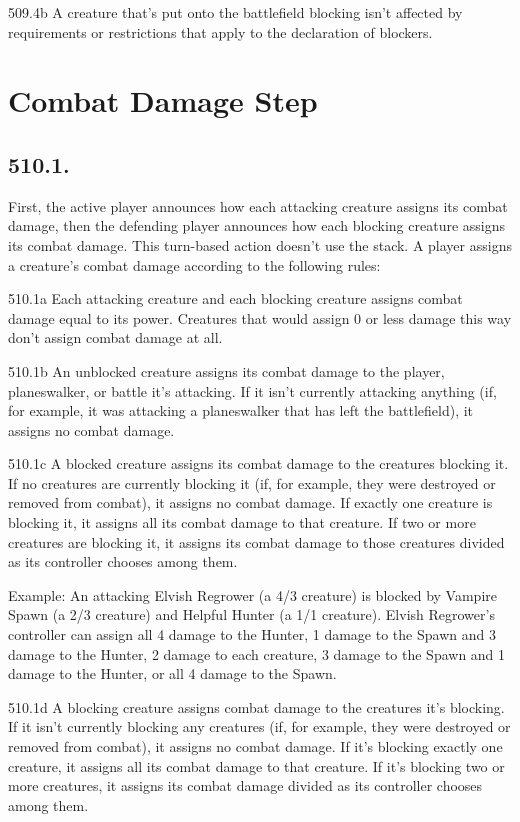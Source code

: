 509.4b A creature that’s put onto the battlefield blocking isn’t affected by requirements or restrictions that apply to the declaration of blockers.

\section{Combat Damage Step}
\subsection*{510.1.}
First, the active player announces how each attacking creature assigns its combat damage, then the defending player announces how each blocking creature assigns its combat damage. This turn-based action doesn’t use the stack. A player assigns a creature’s combat damage according to the following rules:

510.1a Each attacking creature and each blocking creature assigns combat damage equal to its power. Creatures that would assign 0 or less damage this way don’t assign combat damage at all.

510.1b An unblocked creature assigns its combat damage to the player, planeswalker, or battle it’s attacking. If it isn’t currently attacking anything (if, for example, it was attacking a planeswalker that has left the battlefield), it assigns no combat damage.

510.1c A blocked creature assigns its combat damage to the creatures blocking it. If no creatures are currently blocking it (if, for example, they were destroyed or removed from combat), it assigns no combat damage. If exactly one creature is blocking it, it assigns all its combat damage to that creature. If two or more creatures are blocking it, it assigns its combat damage to those creatures divided as its controller chooses among them.

Example: An attacking Elvish Regrower (a 4/3 creature) is blocked by Vampire Spawn (a 2/3 creature) and Helpful Hunter (a 1/1 creature). Elvish Regrower’s controller can assign all 4 damage to the Hunter, 1 damage to the Spawn and 3 damage to the Hunter, 2 damage to each creature, 3 damage to the Spawn and 1 damage to the Hunter, or all 4 damage to the Spawn.

510.1d A blocking creature assigns combat damage to the creatures it’s blocking. If it isn’t currently blocking any creatures (if, for example, they were destroyed or removed from combat), it assigns no combat damage. If it’s blocking exactly one creature, it assigns all its combat damage to that creature. If it’s blocking two or more creatures, it assigns its combat damage divided as its controller chooses among them.

